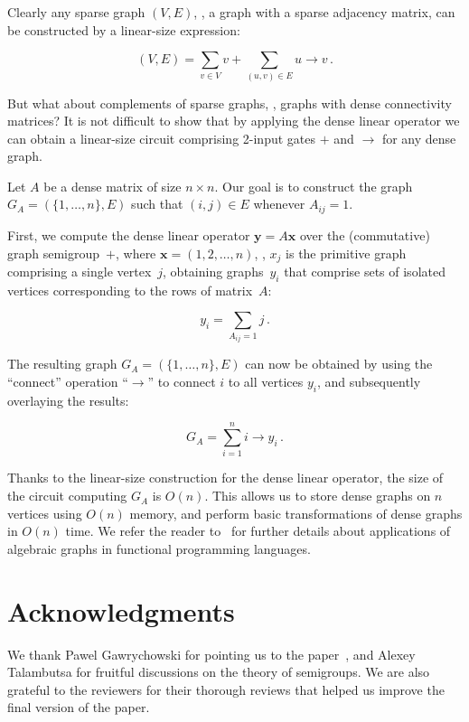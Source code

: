 \documentclass{toc}
\begin{document}
\noindent
Clearly any sparse graph $(V, E)$, \ie, a graph with a sparse
adjacency  %
matrix, can be constructed by a linear-size expression:

\[
(V, E) = \sum_{v \in V} v + \sum_{(u,v) \in E} u \rightarrow v\,.
\]

\noindent
But what about complements of sparse graphs, \ie, graphs with dense
connectivity matrices?  %
It is not difficult to show that by applying the dense
linear operator we can obtain a linear-size circuit comprising 2-input gates
$+$ and $\rightarrow$ for any dense graph.

Let $A$ be a dense matrix of size $n\times n$. Our goal is to construct the
graph $G_A = (\{1, \dots, n\}, E)$ such that $(i,j) \in E$ whenever $A_{ij}=1$.

First, we compute the dense linear operator $\mathbf{y} = A \mathbf{x}$ over the
(commutative) graph semigroup~$+$, where $\mathbf{x} = (1, 2, \dots, n)$, \ie,
$x_j$ is the primitive graph comprising a single vertex~$j$, obtaining
graphs~$y_i$ that comprise sets of isolated vertices corresponding to the rows
of matrix~$A$:

\[
y_i = \sum_{A_{ij}=1} j \, .
\]

The resulting graph $G_A = (\{1, \dots, n\}, E)$ can now be obtained by using
the %
``connect''  %
operation %
``$\rightarrow$''  %
to connect $i$ to all vertices $y_i$,  %
and subsequently overlaying the results:

\[
G_A = \sum_{i=1}^{n} i \rightarrow y_i\,.
\]

Thanks to the linear-size construction for the dense linear operator, the size
of the circuit computing $G_A$ is $O(n)$. This allows us to store dense graphs
on $n$ vertices using $O(n)$ memory, and perform basic transformations of dense
graphs in $O(n)$ time. We refer the reader to~\cite{mokhov2017algebraic} for
further details about applications of algebraic graphs in functional programming
languages.


\section*{Acknowledgments}
We thank Pawel Gawrychowski for pointing us to the
paper~\cite{DBLP:journals/ijcga/ChazelleR91}, and Alexey Talambutsa for
fruitful discussions on the theory of semigroups.
We are also grateful to the reviewers for their thorough reviews that helped us
improve the final version of the paper.
\end{document}
